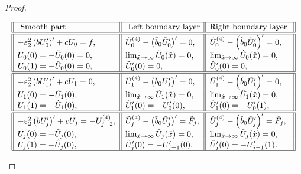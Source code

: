 \documentclass[12pt]{article}
\newcommand{\eps}{\varepsilon}
\begin{document}
\begin{proof}
\begin{table}[h]\label{table1}
\begin{center}
\begin{equation*}
\begin{array}{||l||l||l||}
\hline \text { Smooth part } & \text { Left boundary layer} & \text {Right boundary layer }\\
\hline \hline-\eps_2^2 \left(b U_0^{\prime}\right)^{\prime}+c U_0=f, & \tilde{U}_0^{(4)}-\left(\tilde{b}_0 \tilde{U}_0^{\prime}\right)^{\prime}=0, & \hat{U}_0^{(4)}-\left(\hat{b}_0 \hat{U}_0^{\prime}\right)^{\prime}=0, \\
U_0(0)=-\tilde{U}_0(0)=0, & \lim _{\tilde{x} \rightarrow \infty} \tilde{U}_0(\tilde{x})=0, & \lim _{\hat{x} \rightarrow \infty} \hat{U}_0(\hat{x})=0, \\
U_0(1)=-\hat{U}_0(0)=0, & \tilde{U}_0^{\prime}(0)=0, & \hat{U}_0^{\prime}(0)=0, \\
\hline \hline-\eps_2^2 \left(b U_1^{\prime}\right)^{\prime}+c U_1=0, & \tilde{U}_1^{(4)}-\left(\tilde{b}_0 \tilde{U}_1^{\prime}\right)^{\prime}=0, & \hat{U}_1^{(4)}-\left(\hat{b}_0 \hat{U}_1^{\prime}\right)^{\prime}=0, \\
U_1(0)=-\tilde{U}_1(0), & \lim _{\tilde{x} \rightarrow \infty} \tilde{U}_1(\tilde{x})=0, & \lim _{\hat{x} \rightarrow \infty} \hat{U}_1(\hat{x})=0, \\
U_1(1)=-\hat{U}_1(0), & \tilde{U}_1^{\prime}(0)=-U_0^{\prime}(0), & \hat{U}_1^{\prime}(0)=-U_0^{\prime}(1), \\
\hline \hline-\eps_2^2\left(b U_j^{\prime}\right)'+c U_j=-U_{j-2}^{(4)}, & \tilde{U}_j^{(4)}-\left(\tilde{b}_0 \tilde{U}_j^{\prime}\right)'=\tilde{F}_j, & \hat{U}_j^{(4)}-\left(\hat{b}_0 \hat{U}_j^{\prime}\right)^{\prime}=\hat{F}_j, \\
U_j(0)=-\tilde{U}_j(0), & \lim _{\tilde{x} \rightarrow \infty} \tilde{U}_j(\tilde{x})=0, & \lim _{\hat{x} \rightarrow \infty} \hat{U}_j(\hat{x})=0, \\
U_j(1)=-\hat{U}_j(0), & \tilde{U}_j^{\prime}(0)=-U_{j-1}^{\prime}(0), & \hat{U}_j^{\prime}(0)=-U_{j-1}^{\prime}(1) . \\
\hline
\end{array}
%
\end{equation*}
\end{center}
\caption{Different boundary value problems satisfied by $U_j, \tilde{U}_j, \hat{U}_j , j \in \mathbb{N}_0$.}
\end{table}
%


\end{proof}
\end{document}
